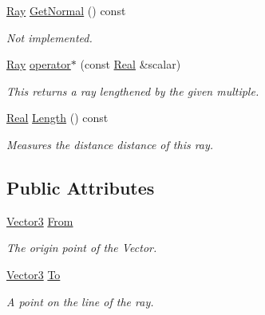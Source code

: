 \begin{DoxyCompactItemize}
\hyperlink{classphys_1_1Ray}{Ray} \hyperlink{classphys_1_1Ray_a7445c25acb6ce865ef85e7ada829ccba}{GetNormal} () const 
\begin{DoxyCompactList}\small\item\em Not implemented. \item\end{DoxyCompactList}\item 
\hyperlink{classphys_1_1Ray}{Ray} \hyperlink{classphys_1_1Ray_a9f26694f254725135f56f694b2e5df06}{operator$\ast$} (const \hyperlink{namespacephys_af7eb897198d265b8e868f45240230d5f}{Real} \&scalar)
\begin{DoxyCompactList}\small\item\em This returns a ray lengthened by the given multiple. \item\end{DoxyCompactList}\item 
\hyperlink{namespacephys_af7eb897198d265b8e868f45240230d5f}{Real} \hyperlink{classphys_1_1Ray_add544025fcd6d1cdcfed3c0413b3701b}{Length} () const 
\begin{DoxyCompactList}\small\item\em Measures the distance distance of this ray. \item\end{DoxyCompactList}\end{DoxyCompactItemize}
\subsection*{Public Attributes}
\begin{DoxyCompactItemize}
\item 
\hypertarget{classphys_1_1Ray_a3004d52f8f1e317ee602f8f278531057}{
\hyperlink{classphys_1_1Vector3}{Vector3} \hyperlink{classphys_1_1Ray_a3004d52f8f1e317ee602f8f278531057}{From}}
\label{df/d57/classphys_1_1Ray_a3004d52f8f1e317ee602f8f278531057}

\begin{DoxyCompactList}\small\item\em The origin point of the Vector. \item\end{DoxyCompactList}\item 
\hypertarget{classphys_1_1Ray_aa2585a1c6d29d1533c816e7277baf1ad}{
\hyperlink{classphys_1_1Vector3}{Vector3} \hyperlink{classphys_1_1Ray_aa2585a1c6d29d1533c816e7277baf1ad}{To}}
\label{df/d57/classphys_1_1Ray_aa2585a1c6d29d1533c816e7277baf1ad}

\begin{DoxyCompactList}\small\item\em A point on the line of the ray. \item\end{DoxyCompactList}\end{DoxyCompactItemize}


